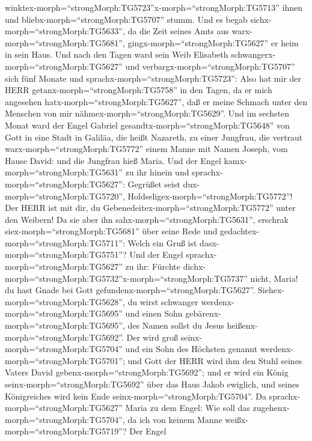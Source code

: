 winktex-morph=``strongMorph:TG5723''x-morph=``strongMorph:TG5713'' ihnen
und bliebx-morph=``strongMorph:TG5707'' stumm.  Und es
begab sichx-morph=``strongMorph:TG5633'', da die Zeit seines Amts aus
warx-morph=``strongMorph:TG5681'', gingx-morph=``strongMorph:TG5627'' er
heim in sein Haus.  Und nach den Tagen ward sein Weib
Elisabeth schwangerx-morph=``strongMorph:TG5627'' und
verbargx-morph=``strongMorph:TG5707'' sich fünf Monate und
sprachx-morph=``strongMorph:TG5723'':  Also hat mir der
HERR getanx-morph=``strongMorph:TG5758'' in den Tagen, da er mich
angesehen hatx-morph=``strongMorph:TG5627'', daß er meine Schmach unter
den Menschen von mir nähmex-morph=``strongMorph:TG5629''. 
Und im sechsten Monat ward der Engel Gabriel
gesandtx-morph=``strongMorph:TG5648'' von Gott in eine Stadt in Galiläa,
die heißt Nazareth,  zu einer Jungfrau, die vertraut
warx-morph=``strongMorph:TG5772'' einem Manne mit Namen Joseph, vom
Hause David: und die Jungfrau hieß Maria.  Und der Engel
kamx-morph=``strongMorph:TG5631'' zu ihr hinein und
sprachx-morph=``strongMorph:TG5627'': Gegrüßet seist
dux-morph=``strongMorph:TG5720'',
Holdseligex-morph=``strongMorph:TG5772''! Der HERR ist mit dir, du
Gebenedeitex-morph=``strongMorph:TG5772'' unter den Weibern!
 Da sie aber ihn sahx-morph=``strongMorph:TG5631'',
erschrak siex-morph=``strongMorph:TG5681'' über seine Rede und
gedachtex-morph=``strongMorph:TG5711'': Welch ein Gruß ist
dasx-morph=``strongMorph:TG5751''?  Und der Engel
sprachx-morph=``strongMorph:TG5627'' zu ihr: Fürchte
dichx-morph=``strongMorph:TG5732''\textbar x-morph=``strongMorph:TG5737''
nicht, Maria! du hast Gnade bei Gott
gefundenx-morph=``strongMorph:TG5627''. 
Siehex-morph=``strongMorph:TG5628'', du wirst schwanger
werdenx-morph=``strongMorph:TG5695'' und einen Sohn
gebärenx-morph=``strongMorph:TG5695'', des Namen sollst du Jesus
heißenx-morph=``strongMorph:TG5692''.  Der wird groß
seinx-morph=``strongMorph:TG5704'' und ein Sohn des Höchsten genannt
werdenx-morph=``strongMorph:TG5701''; und Gott der HERR wird ihm den
Stuhl seines Vaters David gebenx-morph=``strongMorph:TG5692'';
 und er wird ein König seinx-morph=``strongMorph:TG5692''
über das Haus Jakob ewiglich, und seines Königreiches wird kein Ende
seinx-morph=``strongMorph:TG5704''.  Da
sprachx-morph=``strongMorph:TG5627'' Maria zu dem Engel: Wie soll das
zugehenx-morph=``strongMorph:TG5704'', da ich von keinem Manne
weißx-morph=``strongMorph:TG5719''?  Der Engel
